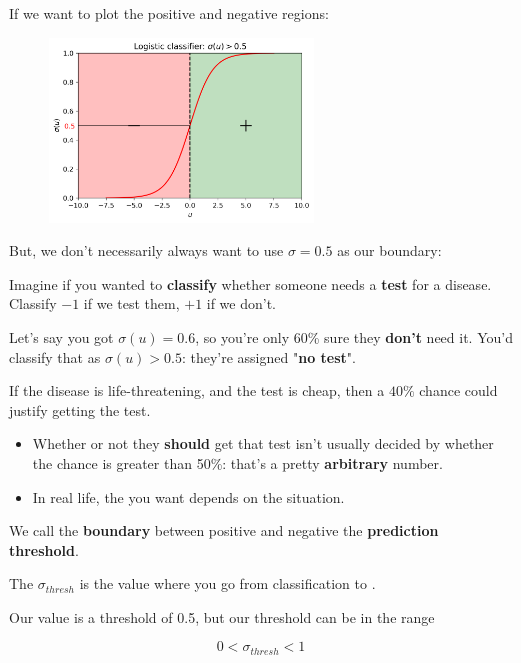         If we want to plot the positive and negative regions:
        
        \begin{figure}[H]
            \centering
            
            \includegraphics[width=70mm,scale=0.5]{images/classification_images/sigmoid_.5.png}

        \end{figure}
        
        But, we don't necessarily always want to use $\sigma=0.5$ as our boundary:
        
        \miniex Imagine if you wanted to \textbf{classify} whether someone needs a \textbf{test} for a disease. Classify $-1$ if we test them, $+1$ if we don't.
        
        Let's say you got $\sigma(u)=0.6$, so you're only 60\% sure they \textbf{don't} need it. You'd classify that as $\sigma(u)>0.5$: they're assigned "\textbf{no test}".

        If the disease is life-threatening, and the test is cheap, then a $40\%$ chance could justify getting the test.

        \begin{itemize}
            \item Whether or not they \textbf{should} get that test isn't usually decided by whether the chance is greater than 50\%: that's a pretty \textbf{arbitrary} number. 
            \item In real life, the  you want depends on the situation.
        \end{itemize}

        
        We call the \textbf{boundary} between positive and negative the \textbf{prediction threshold}.\\
        
        \begin{definition}
            The  $\sigma_{thresh}$ is the value where you go from  classification to .
            
            \subsecdiv
            
            Our  value is a threshold of 0.5, but our threshold can be  in the range
            
            \begin{equation*}
                0 < \sigma_{thresh} < 1
            \end{equation*}
        \end{definition}
        
